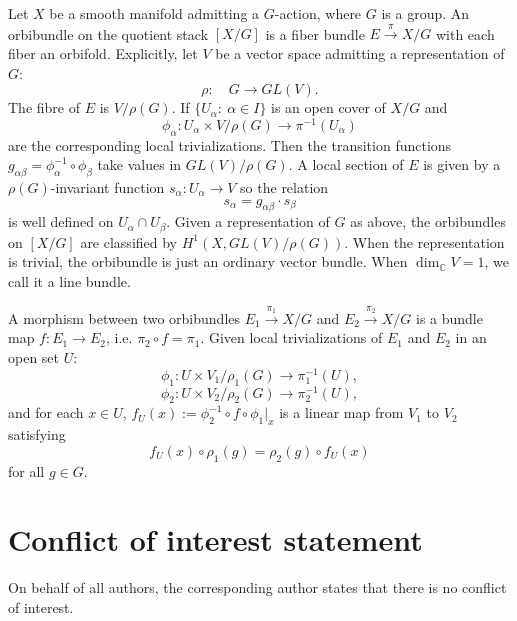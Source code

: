 \documentclass[a4paper,11pt]{article}
\numberwithin{equation}{section}
\begin{document}
Let $X$ be a smooth manifold admitting a $G$-action, where $G$ is a group.
An orbibundle on the quotient stack $[X/G]$ is a fiber bundle $E 
\stackrel{\pi}{\rightarrow} X/G $ with each fiber an orbifold. Explicitly, let 
$V$ be a vector space admitting a representation of $G$:
\[
\rho:\quad G \rightarrow GL(V).
\]
The fibre of $E$ is $V/\rho(G)$. If $\{U_\alpha:~\alpha \in I\}$ is an open 
cover of $X/G$ and
\[
\phi_\alpha: U_\alpha \times V/\rho(G) \rightarrow \pi^{-1}(U_\alpha)
\]
are the corresponding local trivializations. Then the transition functions 
$g_{\alpha\beta} = \phi^{-1}_\alpha \circ \phi_\beta$ take values in 
$GL(V)/\rho(G)$. A local section of $E$ is given by a $\rho(G)$-invariant 
function $s_\alpha: U_\alpha \rightarrow V$ so the relation
\[
s_\alpha = g_{\alpha\beta}\cdot s_\beta
\]
is well defined on $U_\alpha \cap U_\beta$. Given a representation of $G$ as 
above, the orbibundles on $[X/G]$ are classified by $H^1(X,GL(V)/\rho(G))$. When 
the representation is trivial, the orbibundle is just an ordinary vector bundle. 
When $\dim_{\mathbb{C}}V=1$, we call it a line bundle.

A morphism between two orbibundles $E_1\stackrel{\pi_1}{\rightarrow} X/G$ and 
$E_2\stackrel{\pi_2}{\rightarrow} X/G$ is a bundle map $f: E_1 \rightarrow E_2$, 
i.e. $\pi_2 \circ f = \pi_1$. Given local trivializations of $E_1$ and $E_2$ in 
an open set $U$:
\[
\phi_1: U \times V_1/\rho_1(G) \rightarrow \pi_1^{-1}(U),
\]
\[
\phi_2: U \times V_2/\rho_2(G) \rightarrow \pi_2^{-1}(U),
\]
and for each $x \in U$,
$f_U(x) := \phi_2^{-1} \circ f \circ \phi_1|_x$ is a linear map from $V_1$ to 
$V_2$ satisfying
\[
f_U(x) \circ \rho_1(g) = \rho_2(g) \circ f_U(x)
\]
for all $g \in G$.


\section*{Conflict of interest statement}

On behalf of all authors, the corresponding author states that there is no conflict of interest.






\end{document}
